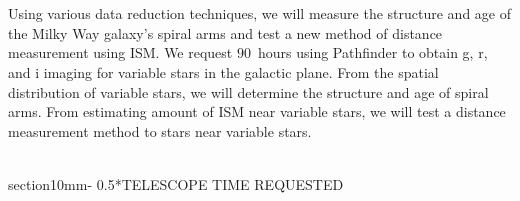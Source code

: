\documentclass[letterpaper,11pt]{article}
\makeatletter
\renewcommand{\section}{\@startsection%
{section}{1}{0mm}{-\baselineskip}%
{0.5\baselineskip}{\normalfont\Large\bfseries}}%
\newenvironment{Frame}{%
  \noindent\setbox\FrameBox\hbox\bgroup\minipage{1.01\textwidth}\parskip\baselineskip\ignorespaces
}{%
  \endminipage\egroup\fbox{\box\FrameBox}\par
}
\makeatother
\begin{document}
~\\~\\ %

\begin{Frame}
\noindent {\bf \\Abstract:}
Using various data reduction techniques, we will measure the structure and age of the Milky Way galaxy's spiral arms and test a new method of distance measurement using ISM. We request $90$~hours using Pathfinder to obtain g, r, and i imaging for variable stars in the galactic plane. From the spatial distribution of variable stars, we will determine the structure and age of spiral arms. From estimating amount of ISM near variable stars, we will test a distance measurement method to stars near variable stars.

\end{Frame}
~\\


\section*{TELESCOPE TIME REQUESTED}

\begin{table}[H]\label{tab:request-telescope-time}
	\begin{center}
	\end{center}
\end{table}
\end{document}
